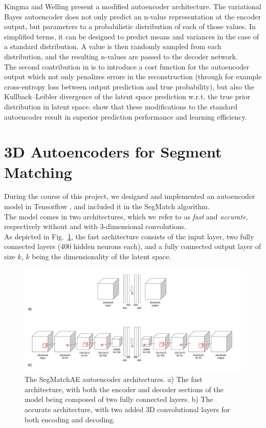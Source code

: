 Kingma and Welling \cite{variational-autoencoder} present a modified autoencoder architecture. The variational Bayes autoencoder does not only predict an n-value representation at the encoder output, but parameters to a probabilistic distribution of each of those values. In simplified terms, it can be designed to predict means and variances in the case of a standard distribution. A value is then randomly sampled from each distribution, and the resulting n-values are passed to the decoder network.\\

The second contribution in \citet{variational-autoencoder} is to introduce a cost function for the autoencoder output which not only penalizes errors in the reconstruction (through for example cross-entropy loss between output prediction and true probability), but also the Kullback–Leibler divergence of the latent space prediction w.r.t. the true prior distribution in latent space. \citet{variational-autoencoder} show that these modifications to the standard autoencoder result in superior prediction performance and learning efficiency.

\section{3D Autoencoders for Segment Matching}
\label{sec:ae-implementation}

During the course of this project, we designed and implemented an autoencoder model in Tensorflow \cite{tensorflow}, and included it in the SegMatch algorithm.\\

The model comes in two architectures, which we refer to as \textit{fast} and \textit{accurate}, respectively without and with 3-dimensional convolutions.\\

As depicted in Fig.~\ref{fig:architecture}, the fast architecture consists of the input layer, two fully connected layers (400 hidden neurons each), and a fully connected output layer of size $k$, $k$ being the dimensionality of the latent space.

\begin{figure}
  \centering
  \includegraphics[width=5.2in]{images/architecture.pdf}
  \caption{The SegMatchAE autoencoder architectures. a) The fast architecture, with both the encoder and decoder sections of the model being composed of two fully connected layers. b) The accurate architecture, with two added 3D convolutional layers for both encoding and decoding.}
  \label{fig:architecture}
\end{figure}

